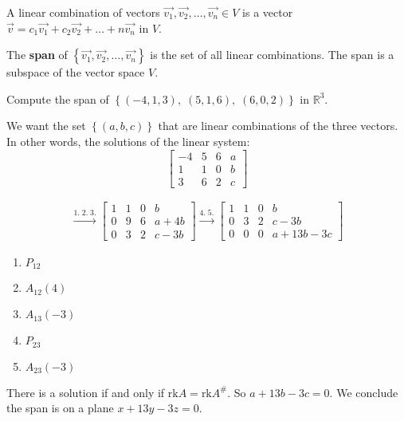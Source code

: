 \documentclass[../main.tex]{subfiles}
\begin{document}
\begin{definition}[Span]
    A linear combination of vectors \( \vec{v_1}, \vec{v_2}, \dots, \vec{v_n} \in V \) is a vector
    \( \vec{v} = c_1\vec{v_1}+c_2\vec{v_2}+\dots+n\vec{v_n} \) in \( V \).

    The \textbf{span} of \( \left\{ \vec{v_1}, \vec{v_2}, \dots, \vec{v_n} \right\} \) is the set of all linear combinations.
    The span is a subspace of the vector space \( V \).
\end{definition}

\begin{example}[]
    Compute the span of \( \left\{ (-4, 1, 3), \; (5,1,6), \; (6,0,2) \right\} \) in \( \mathbb{R}^3 \).

    We want the set \( \left\{ (a,b,c) \right\} \) that are linear combinations of the three vectors.
    In other words, the solutions of the linear system:
    \[ \begin{bmatrix}
        -4 & 5 & 6 & a \\
        1 & 1 & 0 & b \\
        3 & 6 & 2 & c
    \end{bmatrix} \]

    \begin{gather*}
        \xrightarrow[]{1. \; 2. \; 3.}
        \begin{bmatrix}
            1 & 1 & 0 & b \\
            0 & 9 & 6 & a+4b \\
            0 & 3 & 2 & c-3b
        \end{bmatrix}
        \xrightarrow[]{4. \; 5.}
        \begin{bmatrix}
            1 & 1 & 0 & b \\
            0 & 3 & 2 & c-3b \\
            0 & 0 & 0 & a+13b-3c
        \end{bmatrix}
    \end{gather*}
    \begin{enumerate}
        \item \( P_{12} \)
        \item \( A_{12}(4) \)
        \item \( A_{13}(-3) \)
        \item \( P_{23} \)
        \item \( A_{23}(-3) \)
    \end{enumerate}
    There is a solution if and only if \( \text{rk}A = \text{rk}A^\# \).
    So \( a+13b-3c = 0 \). We conclude the span is on a plane \( \boxed{x+13y-3z=0} \).
\end{example}
\end{document}
